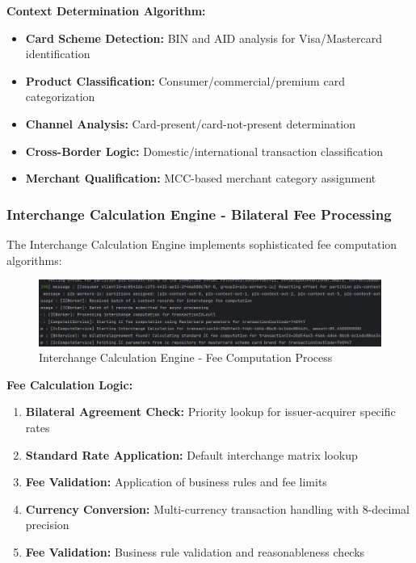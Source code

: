 \textbf{Context Determination Algorithm:}
\begin{itemize}
    \item \textbf{Card Scheme Detection:} BIN and AID analysis for Visa/Mastercard identification
    \item \textbf{Product Classification:} Consumer/commercial/premium card categorization
    \item \textbf{Channel Analysis:} Card-present/card-not-present determination
    \item \textbf{Cross-Border Logic:} Domestic/international transaction classification
    \item \textbf{Merchant Qualification:} MCC-based merchant category assignment
\end{itemize}

\subsubsection{Interchange Calculation Engine - Bilateral Fee Processing}

The Interchange Calculation Engine implements sophisticated fee computation algorithms:

\begin{figure}[h]
    \centering
    \includegraphics[width=1\textwidth]{img/impl/ic flow.png}
    \caption{Interchange Calculation Engine - Fee Computation Process}
    \label{fig:processing-flow-ic}
\end{figure}

\textbf{Fee Calculation Logic:}
\begin{enumerate}
    \item \textbf{Bilateral Agreement Check:} Priority lookup for issuer-acquirer specific rates
    \item \textbf{Standard Rate Application:} Default interchange matrix lookup
    \item \textbf{Fee Validation:} Application of business rules and fee limits
    \item \textbf{Currency Conversion:} Multi-currency transaction handling with 8-decimal precision
    \item \textbf{Fee Validation:} Business rule validation and reasonableness checks
\end{enumerate}

